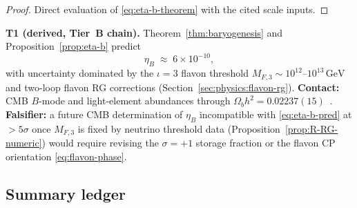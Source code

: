 \begin{proof}
Direct evaluation of \eqref{eq:eta-b-theorem} with the cited scale inputs.
\end{proof}

\begin{prediction}\label{pred:eta-b}
\textbf{T1 (derived, Tier~B chain).}
Theorem~\ref{thm:baryogenesis} and Proposition~\ref{prop:eta-b} predict
\begin{equation}\label{eq:eta-b-pred}
  \eta_B \;\approx\; 6\times 10^{-10},
\end{equation}
with uncertainty dominated by the $\iota=3$ flavon threshold
$M_{F,3}\sim 10^{12}$--$10^{13}\,\mathrm{GeV}$ and two-loop flavon RG
corrections (Section~\ref{sec:physics:flavon-rg}). \textbf{Contact:}
CMB $B$-mode and light-element abundances through
$\Omega_b h^2 = 0.02237(15)$~\cite{PDG2025}.
\textbf{Falsifier:} a future CMB determination of $\eta_B$ incompatible with
\eqref{eq:eta-b-pred} at $>5\sigma$ once $M_{F,3}$ is fixed by neutrino
threshold data (Proposition~\ref{prop:R-RG-numeric}) would require revising
the $\sigma=+1$ storage fraction or the flavon CP orientation
\eqref{eq:flavon-phase}.
\end{prediction}

\subsection{Summary ledger}
\label{sec:baryogenesis:table}

